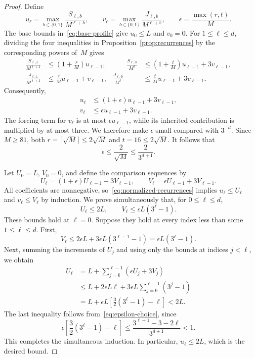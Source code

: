 \begin{proof}
Define
\[
 u_\ell=\max_{b\in\{0,1\}}\frac{S_{\ell,b}}{M^{\ell+b}},
 \qquad
 v_\ell=\max_{b\in\{0,1\}}\frac{J_{\ell,b}}{M^{\ell+b}},
 \qquad
 \epsilon=\frac{\max(r,t)}{M}.
\]
The base bounds in~\eqref{eq:base-profile} give $u_0\leq L$ and $v_0=0$.
For $1\leq\ell\leq d$, dividing the four inequalities in
Proposition~\ref{prop:recurrences} by the corresponding powers of~$M$
gives
\begin{align*}
 \frac{S_{\ell,1}}{M^{\ell+1}}
   &\leq \left(1+\frac rM\right)u_{\ell-1},
 &\qquad
 \frac{S_{\ell,0}}{M^\ell}
   &\leq \left(1+\frac tM\right)u_{\ell-1}+3v_{\ell-1},\\
 \frac{J_{\ell,1}}{M^{\ell+1}}
   &\leq \frac rM u_{\ell-1}+v_{\ell-1},
 &
 \frac{J_{\ell,0}}{M^\ell}
   &\leq \frac tM u_{\ell-1}+3v_{\ell-1}.
\end{align*}
Consequently,
\begin{equation}
\label{eq:normalized-recurrences}
 \begin{split}
  u_\ell&\leq (1+\epsilon)u_{\ell-1}+3v_{\ell-1},\\
  v_\ell&\leq \epsilon u_{\ell-1}+3v_{\ell-1}.
 \end{split}
\end{equation}
The forcing term for $v_\ell$ is at most $\epsilon u_{\ell-1}$, while
its inherited contribution is multiplied by at most three. We therefore
make $\epsilon$ small compared with $3^{-d}$. Since $M\geq81$, both
$r=\lceil\sqrt M\rceil\leq2\sqrt M$ and $t=16\leq2\sqrt M$.
It follows that
\begin{equation}
\label{eq:epsilon-choice}
 \epsilon\leq\frac{2}{\sqrt M}\leq\frac{2}{3^{d+1}}.
\end{equation}

Let $U_0=L$, $V_0=0$, and define the comparison sequences by
\[
 U_\ell=(1+\epsilon)U_{\ell-1}+3V_{\ell-1},
 \qquad
 V_\ell=\epsilon U_{\ell-1}+3V_{\ell-1}.
\]
All coefficients are nonnegative, so~\eqref{eq:normalized-recurrences}
implies $u_\ell\leq U_\ell$ and $v_\ell\leq V_\ell$ by induction.
We prove simultaneously that, for $0\leq\ell\leq d$,
\begin{equation}
\label{eq:comparison-bounds}
 U_\ell\leq2L,
 \qquad
 V_\ell\leq\epsilon L(3^\ell-1).
\end{equation}
These bounds hold at $\ell=0$.
Suppose they hold at every index less than some $1\leq\ell\leq d$.
First,
\[
 V_\ell
 \leq 2\epsilon L+3\epsilon L(3^{\ell-1}-1)
 =\epsilon L(3^\ell-1).
\]
Next, summing the increments of $U_j$ and using only the bounds at
indices $j<\ell$, we obtain
\begin{align*}
 U_\ell
 &=L+\sum_{j=0}^{\ell-1}(\epsilon U_j+3V_j)\\
 &\leq L+2\epsilon L\ell
          +3\epsilon L\sum_{j=0}^{\ell-1}(3^j-1)\\
 &=L+\epsilon L\left[\frac32(3^\ell-1)-\ell\right]
 <2L.
\end{align*}
The last inequality follows from~\eqref{eq:epsilon-choice}, since
\[
 \epsilon\left[\frac32(3^\ell-1)-\ell\right]
 \leq\frac{3^{\ell+1}-3-2\ell}{3^{d+1}}<1.
\]
This completes the simultaneous induction. In particular,
$u_\ell\leq2L$, which is the desired bound.
\end{proof}

